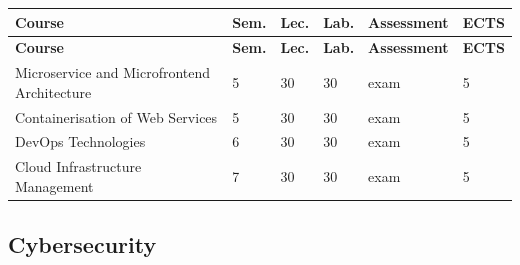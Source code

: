 \documentclass[12pt,a4paper]{article}
\newcommand{\thdrule}{\noalign{\global\setlength{\extrarowheight}{0pt}}}
\newcommand{\thdend}{\noalign{\global\setlength{\extrarowheight}{4pt}}}
\begin{document}
{\scriptsize
\begin{longtable}{m{6.5cm}m{0.7cm}m{1cm}m{1cm}m{1.7cm}m{0.7cm}}
\thdrule\toprule
\rowcolor{pjatkRed}
{\color{white}\footnotesize\textbf{\vphantom{Ag}Course}} & {\color{white}\footnotesize\textbf{\vphantom{Ag}Sem.}} & {\color{white}\footnotesize\textbf{\vphantom{Ag}Lec.}} & {\color{white}\footnotesize\textbf{\vphantom{Ag}Lab.}} & {\color{white}\footnotesize\textbf{\vphantom{Ag}Assessment}} & {\color{white}\footnotesize\textbf{\vphantom{Ag}ECTS}} \\
\midrule\thdend
\endfirsthead
\thdrule\toprule
\rowcolor{pjatkRed}
{\color{white}\footnotesize\textbf{\vphantom{Ag}Course}} & {\color{white}\footnotesize\textbf{\vphantom{Ag}Sem.}} & {\color{white}\footnotesize\textbf{\vphantom{Ag}Lec.}} & {\color{white}\footnotesize\textbf{\vphantom{Ag}Lab.}} & {\color{white}\footnotesize\textbf{\vphantom{Ag}Assessment}} & {\color{white}\footnotesize\textbf{\vphantom{Ag}ECTS}} \\
\midrule\thdend
\endhead
\rowcolor{tableRowLight} Microservice and Microfrontend Architecture & 5 & 30 & 30 & {\scriptsize exam} & 5 \\
\rowcolor{tableRowAlt} Containerisation of Web Services & 5 & 30 & 30 & {\scriptsize exam} & 5 \\
\rowcolor{tableRowLight} DevOps Technologies & 6 & 30 & 30 & {\scriptsize exam} & 5 \\
\rowcolor{tableRowAlt} Cloud Infrastructure Management & 7 & 30 & 30 & {\scriptsize exam} & 5 \\
\bottomrule
\end{longtable}}

\subsection*{Cybersecurity}
\end{document}
